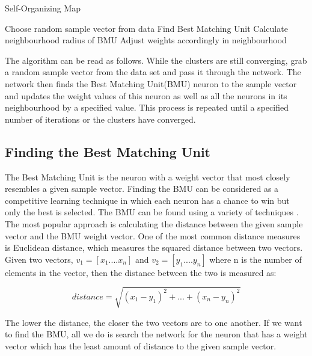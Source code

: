 \documentclass{IEEEtran}
\begin{document}
\begin{algorithm}[!htbp] 
\caption{Self-Organizing Map}
\begin{algorithmic}
\STATE Choose random sample vector from data
\STATE Find Best Matching Unit
\STATE Calculate neighbourhood radius of BMU
\STATE Adjust weights accordingly in neighbourhood
\ENDWHILE
\end{algorithmic}
\end{algorithm}

The algorithm can be read as follows. While the clusters are still converging, grab a random sample vector from the data set and pass it through the network. The network then finds the Best Matching Unit(BMU) neuron to the sample vector and updates the weight values of this neuron as well as all the neurons in its neighbourhood by a specified value. This process is repeated until a specified number of iterations or the clusters have converged.

\subsection{Finding the Best Matching Unit}
The Best Matching Unit is the neuron with a weight vector that most closely resembles a given sample vector. Finding the BMU can be considered as a competitive learning technique in which each neuron has a chance to win but only the best is selected. The BMU can be found using a variety of techniques \cite{thesom}. The most popular approach is calculating the distance between the given sample vector and the BMU weight vector. One of the most common distance measures is Euclidean distance, which measures the squared distance between two vectors. Given two vectors, $v_{1} = [x_{1}....x_{n}]$ and  $v_{2} = [y_{1}....y_{n}]$ where n is the number of elements in the vector, then the distance between the two is measured as:

\begin{equation}
distance = \sqrt{(x_{1}-y_{1})^2 + ... + (x_{n}-y_{n})^2}
\end{equation}

The lower the distance, the closer the two vectors are to one another. If we want to find the BMU, all we do is search the network for the neuron that has a weight vector which has the least amount of distance to the given sample vector.
\end{document}
